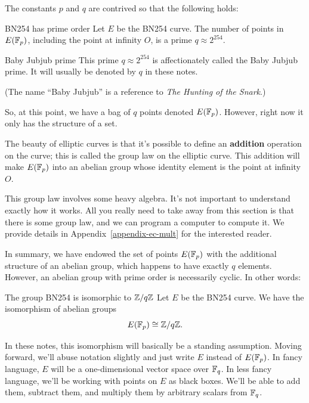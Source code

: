 The constants $p$ and $q$ are contrived so that the following holds:

\begin{theorem}{BN254 has prime order}{}
  Let $E$ be the BN254 curve. The number of
  points in $E( \mathbb{F}_{p} )$, including the point at
  infinity $O$, is a prime $q \approx 2^{254}$.
\end{theorem}

\begin{definition}{Baby Jubjub prime}{}
This prime $q \approx 2^{254}$ is affectionately called the \alert{Baby Jubjub prime}.
It will usually be denoted by $q$ in these notes.
\end{definition}
(The name ``Baby Jubjub'' is a reference to
\emph{The Hunting of the Snark}.)

So, at this point, we have a bag of $q$ points denoted
$E( \mathbb{F}_{p} )$.
However, right now it only has the structure of a set.

The beauty of elliptic curves is that it's possible to define an
\textbf{addition} operation on the curve; this is called the \alert{group law}
on the elliptic curve.
This addition will make $E( \mathbb{F}_{p} )$ into an
abelian group whose identity element is the point at infinity $O$.

This group law involves some heavy algebra. It's not important to
understand exactly how it works. All you really need to take away from
this section is that there is some group law, and we can program a
computer to compute it. We provide details in Appendix~\ref{appendix-ec-mult}
for the interested reader.

In summary, we have endowed the set of points
$E( \mathbb{F}_{p} )$ with the additional structure of an
abelian group, which happens to have exactly $q$ elements. However, an
abelian group with prime order is necessarily cyclic. In other words:

\begin{theorem}{The group BN254 is isomorphic to $\boldmath{\mathbb{Z}/q\mathbb{Z}}$}{}
  Let $E$ be the BN254 curve.
  We have the isomorphism of abelian groups
  \[E( \mathbb{F}_{p} ) \cong \mathbb{Z}/q\mathbb{Z}.\]
\end{theorem}

In these notes, this isomorphism will basically be a standing assumption.
Moving forward, we'll abuse notation slightly and just
write $E$ instead of $E( \mathbb{F}_{p} )$.
In fancy language, $E$ will be a one-dimensional vector space over $\mathbb{F}_{q}$.
In less fancy language, we'll be working with points on $E$ as black boxes.
We'll be able to add them, subtract them, and multiply them by arbitrary scalars from $\mathbb{F}_{q}$.

